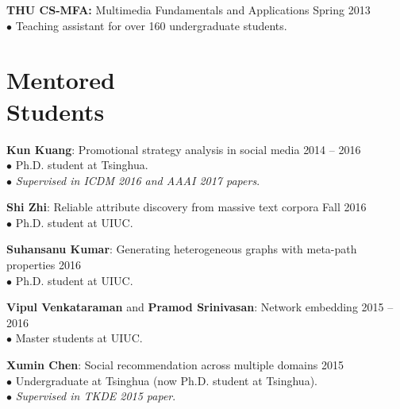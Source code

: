 \documentclass[margin, 10pt]{res}
\begin{document}
\begin{resume}
{\textbf{THU CS-MFA:} Multimedia Fundamentals and Applications} \hfill{Spring 2013} \\
$\bullet$ Teaching assistant for over 160 {undergraduate} students.


\section{Mentored \\ Students}


{\textbf{Kun Kuang}: Promotional strategy analysis in social media} \hfill{2014 -- 2016} \\
$\bullet$ Ph.D. student at Tsinghua. \\
$\bullet$ \textit{Supervised in ICDM 2016 and AAAI 2017 papers}.

{\textbf{Shi Zhi}: Reliable attribute discovery from massive text corpora} \hfill{Fall 2016} \\
$\bullet$ Ph.D. student at UIUC.

{\textbf{Suhansanu Kumar}: Generating heterogeneous graphs with meta-path properties} \hfill{2016} \\
$\bullet$ Ph.D. student at UIUC.

{\textbf{Vipul Venkataraman} and \textbf{Pramod Srinivasan}: Network embedding} \hfill{2015 -- 2016} \\
$\bullet$ Master students at UIUC.

{\textbf{Xumin Chen}: Social recommendation across multiple domains} \hfill{2015} \\
$\bullet$ Undergraduate at Tsinghua (now Ph.D. student at Tsinghua). \\
$\bullet$ \textit{Supervised in TKDE 2015 paper}.


\end{resume}
\end{document}
